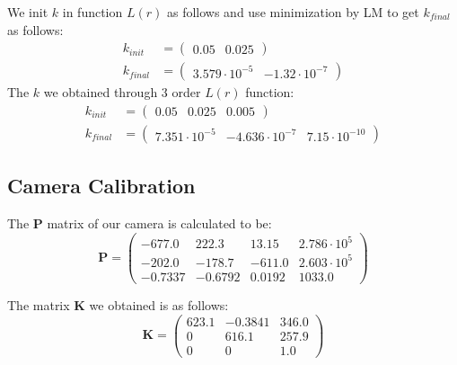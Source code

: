 \documentclass[conference]{IEEEtran}
\newcommand{\mat}[1]{\mathbf{#1}} %
\begin{document}
We init $k$ in function $L(r)$ as follows and use minimization by LM to get $k_{final}$ as follows:
\begin{equation}
\begin{split}
	k_{init} &= \left(\begin{array}{cc} 0.05 & 0.025 \end{array}\right)\\
	k_{final} &= \left(\begin{array}{cc} 3.579\cdot 10^{-5} & -1.32\cdot 10^{-7} \end{array}\right)
\end{split}
\end{equation}
The $k$ we obtained through 3 order $L(r)$ function:
\begin{equation}
	\begin{split}
		k_{init} &= \left(\begin{array}{ccc} 0.05 & 0.025 & 0.005 \end{array}\right)\\
		k_{final} &= \left(\begin{array}{ccc} 7.351\cdot 10^{-5} & -4.636\cdot 10^{-7} & 7.15\cdot 10^{-10} \end{array}\right)
	\end{split}
\end{equation}

\subsection{Camera Calibration}
The $\mat{P}$ matrix of our camera is calculated to be:
\begin{equation}
	\mat{P} = \left(\begin{array}{cccc} -677.0 & 222.3 & 13.15 & 2.786\cdot 10^5\\ -202.0 & -178.7 & -611.0 & 2.603\cdot 10^5\\ -0.7337 & -0.6792 & 0.0192 & 1033.0 \end{array}\right)
\end{equation}

The matrix $\mat{K}$ we obtained is as follows:
\begin{equation}
	\mat{K} = \left(\begin{array}{ccc} 623.1 & -0.3841 & 346.0\\ 0 & 616.1 & 257.9\\ 0 & 0 & 1.0 \end{array}\right)
\end{equation}
\end{document}
